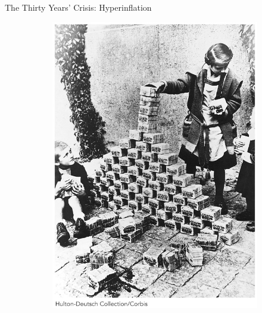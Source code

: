 \documentclass[handout]{beamer}
\begin{document}
\begin{frame}{\LARGE The Thirty Years' Crisis: Hyperinflation}
	\begin{figure}
		\centering
		\begin{subfigure}{0.49\textwidth}
			\centering
			\includegraphics[width = \textwidth,height=.9\textheight]{Deutschmarkpiles.jpg}
		\end{subfigure}
		\begin{subfigure}{0.49\textwidth} %
			\centering

\end{subfigure}
\end{figure}
\end{frame}
\end{document}
